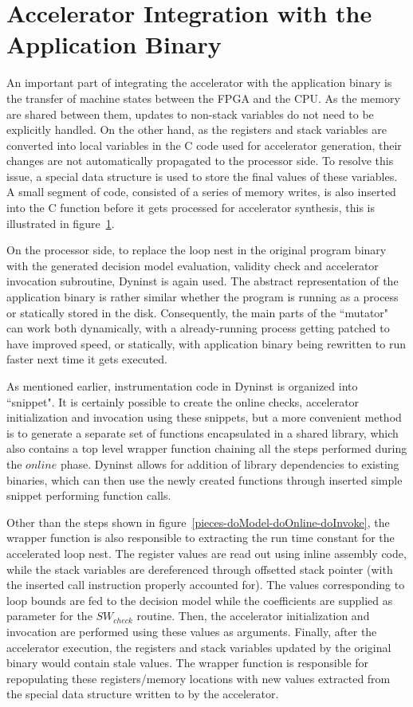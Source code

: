 \section{Accelerator Integration with the Application Binary}
An important part of integrating the accelerator with the application binary is the transfer of machine states between the FPGA and the CPU. As the memory are shared between them, updates to non-stack variables do not need to be explicitly handled. On the other hand, as the registers and stack variables are converted into local variables in the C code used for accelerator generation, their changes are not automatically propagated to the processor side. To resolve this issue, a special data structure is used to store the final values of these variables. A small segment of code, consisted of a series of memory writes, is also inserted into the C function before it gets processed for accelerator synthesis, this is illustrated
in figure~\ref{}.

On the processor side, to replace the loop nest in the original program binary with the generated decision model evaluation, validity check and accelerator invocation subroutine, Dyninst is again used. The abstract representation of the application binary is rather similar whether the program is running as a process or statically
stored in the disk. Consequently, the main parts of the ``mutator"  can work both dynamically, with a already-running process getting patched to have improved speed, or statically, with application binary being rewritten to run faster next time it gets executed. 

As mentioned earlier, instrumentation code in Dyninst is organized into ``snippet". It is certainly possible to create the online checks, accelerator initialization and invocation using these snippets, but a more convenient method is to generate
a separate set of functions encapsulated in a shared library,
which also contains a top level wrapper function chaining all the steps performed during the $online$ phase. Dyninst allows for addition of library dependencies to existing binaries, which can then use the newly created functions through inserted simple snippet performing function calls.



Other than the steps shown in figure~\ref{pieces-doModel-doOnline-doInvoke}, the wrapper function is also responsible to extracting the run time constant for the accelerated loop nest.
The register values are read out using inline assembly code,  while the stack variables are dereferenced through offsetted stack pointer (with the inserted call instruction properly accounted for). The values corresponding to loop bounds are fed to the decision model while the coefficients are supplied as
parameter for the $SW_{check}$ routine. Then, the accelerator initialization and invocation are performed using these values as arguments. 
Finally, after the accelerator execution, the registers and stack variables updated by the original binary would contain stale values. The wrapper function is  responsible for repopulating these registers/memory locations with new values extracted from the special data structure written to by the accelerator.

